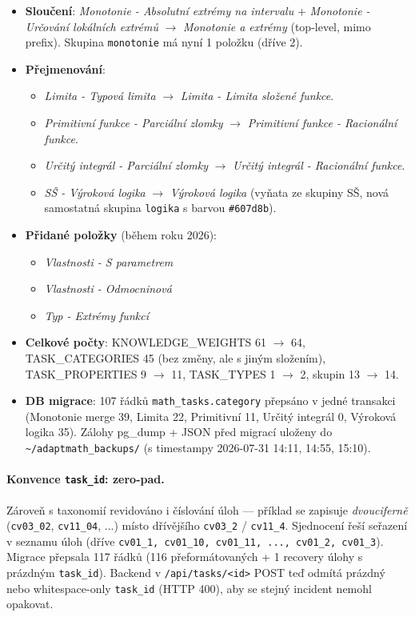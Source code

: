 \documentclass[11pt,a4paper]{article}
\begin{document}
\begin{itemize}
  \item \textbf{Sloučení}: \emph{Monotonie - Absolutní extrémy na intervalu} + \emph{Monotonie - Určování lokálních extrémů} $\rightarrow$ \emph{Monotonie a extrémy} (top-level, mimo prefix). Skupina \texttt{monotonie} má nyní 1 položku (dříve 2).
  \item \textbf{Přejmenování}:
  \begin{itemize}
    \item \emph{Limita - Typová limita} $\rightarrow$ \emph{Limita - Limita složené funkce}.
    \item \emph{Primitivní funkce - Parciální zlomky} $\rightarrow$ \emph{Primitivní funkce - Racionální funkce}.
    \item \emph{Určitý integrál - Parciální zlomky} $\rightarrow$ \emph{Určitý integrál - Racionální funkce}.
    \item \emph{SŠ - Výroková logika} $\rightarrow$ \emph{Výroková logika} (vyňata ze skupiny SŠ, nová samostatná skupina \texttt{logika} s barvou \texttt{\#607d8b}).
  \end{itemize}
  \item \textbf{Přidané položky} (během roku 2026):
  \begin{itemize}
    \item \emph{Vlastnosti - S parametrem}
    \item \emph{Vlastnosti - Odmocninová}
    \item \emph{Typ - Extrémy funkcí}
  \end{itemize}
  \item \textbf{Celkové počty}: KNOWLEDGE\_WEIGHTS 61 $\rightarrow$ 64, TASK\_CATEGORIES 45 (bez změny, ale s jiným složením), TASK\_PROPERTIES 9 $\rightarrow$ 11, TASK\_TYPES 1 $\rightarrow$ 2, skupin 13 $\rightarrow$ 14.
  \item \textbf{DB migrace}: 107 řádků \texttt{math\_tasks.category} přepsáno v jedné transakci (Monotonie merge 39, Limita 22, Primitivní 11, Určitý integrál 0, Výroková logika 35). Zálohy pg\_dump + JSON před migrací uloženy do \texttt{\textasciitilde/adaptmath\_backups/} (s timestampy 2026-07-31 14:11, 14:55, 15:10).
\end{itemize}

\paragraph{Konvence \texttt{task\_id}: zero-pad.} Zároveň s taxonomií revidováno i číslování úloh --- příklad se zapisuje \emph{dvouciferně} (\texttt{cv03\_02}, \texttt{cv11\_04}, ...) místo dřívějšího \texttt{cv03\_2} / \texttt{cv11\_4}. Sjednocení řeší seřazení v seznamu úloh (dříve \texttt{cv01\_1, cv01\_10, cv01\_11, ..., cv01\_2, cv01\_3}). Migrace přepsala 117 řádků (116 přeformátovaných + 1 recovery úlohy s prázdným \texttt{task\_id}). Backend v \texttt{/api/tasks/<id>} POST teď odmítá prázdný nebo whitespace-only \texttt{task\_id} (HTTP 400), aby se stejný incident nemohl opakovat.
\end{document}
